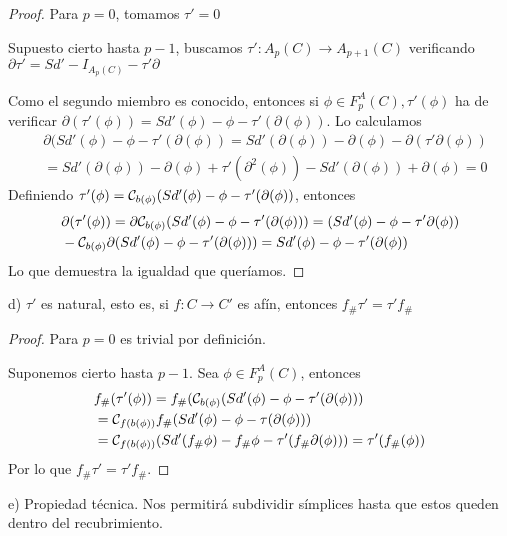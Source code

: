 \begin{proof}
  Para $p = 0$, tomamos $\tau' = 0$

  Supuesto cierto hasta $p-1$, buscamos $\tau' \colon A_p(C) \to A_{p+1}(C)$ verificando \\
  $\partial \tau' = Sd' - I_{A_p(C)} - \tau' \partial$

  Como el segundo miembro es conocido, entonces si $\phi \in F_p^A(C), \tau'(\phi)$ ha de verificar
  $\partial(\tau'(\phi)) = Sd'(\phi) - \phi - \tau'(\partial(\phi))$. Lo calculamos
  \begin{align*}
    &\partial(Sd'(\phi) - \phi - \tau'(\partial(\phi)) = Sd'(\partial(\phi)) - \partial(\phi) - \partial(\tau' \partial(\phi)) \\
    &= Sd'(\partial(\phi)) - \partial(\phi) + \tau'(\partial^2(\phi)) - Sd'(\partial(\phi)) + \partial(\phi) = 0
  \end{align*}
  Definiendo $\tau'(\phi) = {\mathcal C}_{b(\phi)}(Sd'(\phi) - \phi - \tau'(\partial(\phi))$, entonces
  \begin{align*}
    &\partial(\tau'(\phi)) = \partial {\mathcal C}_{b(\phi)}(Sd'(\phi) - \phi -\tau'(\partial(\phi))) = (Sd'(\phi) - \phi - \tau' \partial(\phi)) \\
    &- {\mathcal C}_{b(\phi)} \partial(Sd'(\phi) - \phi - \tau'(\partial(\phi))) = Sd'(\phi) - \phi - \tau'(\partial(\phi))
  \end{align*}
  Lo que demuestra la igualdad que queríamos.
\end{proof}

d) $\tau'$ es natural, esto es, si $f \colon C \to C'$ es afín, entonces $f_\# \tau' = \tau' f_\#$

\begin{proof}
  Para $p = 0$ es trivial por definición.

  Suponemos cierto hasta $p-1$. Sea $\phi \in F_p^A(C)$, entonces
  \begin{align*}
    &f_\#(\tau'(\phi)) = f_\#({\mathcal C}_{b(\phi)}(Sd'(\phi) - \phi - \tau'(\partial(\phi))) \\
    &= {\mathcal C}_{f(b(\phi))} f_\#(Sd'(\phi) - \phi - \tau(\partial(\phi))) \\
    &= {\mathcal C}_{f(b(\phi))}(Sd'(f_\# \phi) - f_\# \phi - \tau'(f_\# \partial(\phi))) = \tau'(f_\#(\phi))
  \end{align*}
  Por lo que $f_\# \tau' = \tau' f_\#$.
\end{proof}

e) Propiedad técnica. Nos permitirá subdividir símplices hasta que estos queden dentro del recubrimiento.

